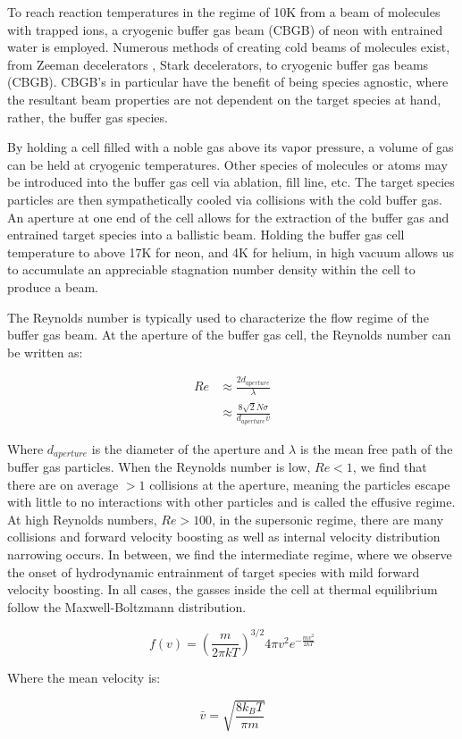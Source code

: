 To reach reaction temperatures in the regime of 10K from a beam of molecules with trapped ions, a cryogenic buffer gas beam (CBGB) of neon with entrained water is employed. Numerous methods of creating cold beams of molecules exist, from Zeeman decelerators \cite{Narevicius2008}, Stark decelerators, to cryogenic buffer gas beams (CBGB). CBGB's in particular have the benefit of being species agnostic, where the resultant beam properties are not dependent on the target species at hand, rather, the buffer gas species. 

By holding a cell filled with a noble gas above its vapor pressure, a volume of gas can be held at cryogenic temperatures. Other species of molecules or atoms may be introduced into the buffer gas cell via ablation, fill line, etc. The target species particles are then sympathetically cooled via collisions with the cold buffer gas. An aperture at one end of the cell allows for the extraction of the buffer gas and entrained target species into a ballistic beam. Holding the buffer gas cell temperature to above 17K for neon, and 4K for helium, in high vacuum allows us to accumulate an appreciable stagnation number density within the cell to produce a beam. 

The Reynolds number is typically used to characterize the flow regime of the buffer gas beam. At the aperture of the buffer gas cell, the Reynolds number can be written as:

\begin{align}
	Re & \approx \frac{2 d_{aperture}}{\lambda} \nonumber \\
	& \approx \frac{8\sqrt{2} \dot{N} \sigma}{d_{aperture} \bar{v}} \label{eq: reynolds}
\end{align}

Where $d_{aperture}$ is the diameter of the aperture and $\lambda$ is the mean free path of the buffer gas particles.\cite{Hutzler2012} When the Reynolds number is low, $Re<1$, we find that there are on average $>1$ collisions at the aperture, meaning the particles escape with little to no interactions with other particles and is called the effusive regime. At high Reynolds numbers, $Re>100$, in the supersonic regime, there are many collisions and forward velocity boosting as well as internal velocity distribution narrowing occurs. In between, we find the intermediate regime, where we observe the onset of hydrodynamic entrainment of target species with mild forward velocity boosting. In all cases, the gasses inside the cell at thermal equilibrium follow the Maxwell-Boltzmann distribution.

\begin{equation}
	f(v) = \left(\frac{m}{2 \pi k T}\right)^{3/2}4 \pi v^2 e^{-\frac{m v^2}{2 k T}} \label{eq: mb_distribution}
\end{equation}

Where the mean velocity is:

\begin{equation}
	\bar{v} = \sqrt{\frac{8 k_B T}{\pi m}} \label{eq: mb_mean}
\end{equation}